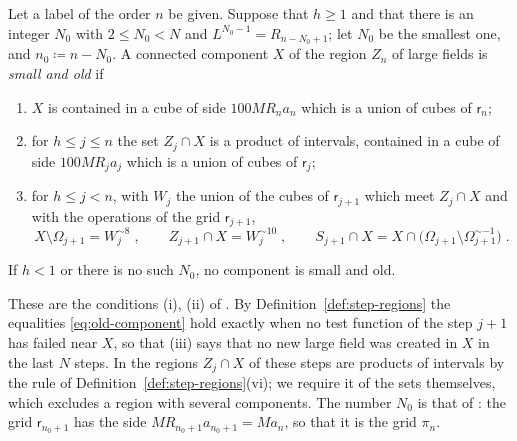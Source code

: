 \documentclass[11pt]{preprint}
\numberwithin{equation}{section}
\begin{document}
\begin{definition}\label{def:treated-components}
Let a label of the order $n$ be given. Suppose that $h \geqslant 1$ and that there is an integer $N_0$ with $2 \leqslant N_0 < N$ and $L^{N_0-1} = R_{n-N_0+1}$; let $N_0$ be the smallest one, and $n_0 \coloneqq n - N_0$. A connected component $X$ of the region $Z_n$ of large fields is \emph{small and old} if
\begin{enumerate}[label=(\roman*)]
\item $X$ is contained in a cube of side $100MR_na_n$ which is a union of cubes of $\mathsf r_n$;
\item for $h \leqslant j \leqslant n$ the set $Z_j \cap X$ is a product of intervals, contained in a cube of side $100MR_ja_j$ which is a union of cubes of $\mathsf r_j$;
\item for $h \leqslant j < n$, with $W_j$ the union of the cubes of $\mathsf r_{j+1}$ which meet $Z_j \cap X$ and with the operations of the grid $\mathsf r_{j+1}$,
\begin{equation}\label{eq:old-component}
    X \setminus \Omega_{j+1} = W_j^{\sim8}\;,
    \qquad
    Z_{j+1} \cap X = W_j^{\sim10}\;,
    \qquad
    S_{j+1} \cap X = X \cap \bigl(\Omega_{j+1} \setminus \Omega^{\sim-1}_{j+1}\bigr)\;.
\end{equation}
\end{enumerate}
If $h < 1$ or there is no such $N_0$, no component is small and old.
\end{definition}

These are the conditions (i), (ii) of \cite[p.~177]{BalabanLFR1}. By Definition~\ref{def:step-regions} the equalities \eqref{eq:old-component} hold exactly when no test function of the step $j + 1$ has failed near $X$, so that (iii) says that no new large field was created in $X$ in the last $N$ steps. In \cite{BalabanLFR1} the regions $Z_j \cap X$ of these steps are products of intervals by the rule of Definition~\ref{def:step-regions}(vi); we require it of the sets themselves, which excludes a region with several components. The number $N_0$ is that of \cite[p.~179]{BalabanLFR1}: the grid $\mathsf r_{n_0+1}$ has the side $MR_{n_0+1}a_{n_0+1} = Ma_n$, so that it is the grid $\pi_n$.
\end{document}
